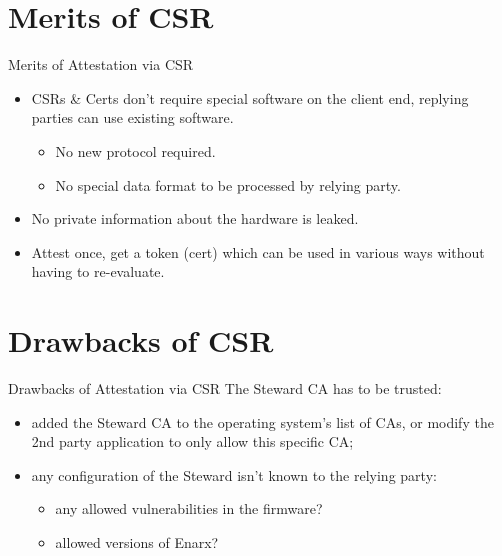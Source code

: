 \documentclass[graphics,compress]{beamer}
\begin{document}
\section{Merits of CSR}
\begin{frame}{Merits of Attestation via CSR}
\begin{itemize}
    \item CSRs \& Certs don't require special software on the client end, replying parties can use existing software.
    \begin{itemize}
        \item No new protocol required.
        \item No special data format to be processed by relying party.
    \end{itemize}
    \item No private information about the hardware is leaked.
    \item Attest once, get a token (cert) which can be used in various ways without having to re-evaluate.
\end{itemize}
\end{frame}

\section{Drawbacks of CSR}
\begin{frame}{Drawbacks of Attestation via CSR}
The Steward CA has to be trusted:
\begin{itemize}
    \item added the Steward CA to the operating system's list of CAs, or modify the 2nd party application to only allow this specific CA;
    \item any configuration of the Steward isn't known to the relying party:
    \begin{itemize}
        \item any allowed vulnerabilities in the firmware?
        \item allowed versions of Enarx?
    \end{itemize}
\end{itemize}
\end{frame}
\end{document}
